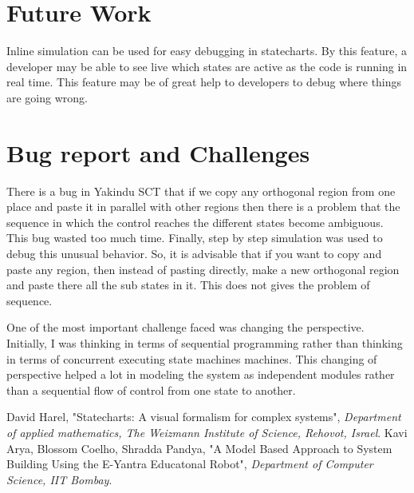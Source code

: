 \documentclass[a4paper,12pt,oneside]{book}
\begin{document}
\section{Future Work}
Inline simulation can be used for easy debugging in statecharts. By this feature, a developer may be able to see live which states are active as the code is running in real time. This feature may be of great help to developers to debug where things are going wrong.
\pagebreak
\section{Bug report and Challenges}
There is a bug in Yakindu SCT that if we copy any orthogonal region from one place and paste it in parallel with other regions then there is a problem that the sequence in which the control reaches the different states become ambiguous. This bug wasted too much time. Finally, step by step simulation was used to debug this unusual behavior. So, it is advisable that if you want to copy and paste any region, then instead of pasting directly, make a new orthogonal region and paste there all the sub states in it. This does not gives the problem of sequence.

One of the most important challenge faced was changing the perspective. Initially, I was thinking in terms of sequential programming rather than thinking in terms of concurrent executing state machines machines. This changing of perspective helped a lot in modeling the system as independent modules rather than a sequential flow of control from one state to another. 
\begin{thebibliography}{li}
 David Harel, "Statecharts: A visual formalism for complex systems", \emph{Department of applied mathematics, The Weizmann Institute
	of Science, Rehovot, Israel}.
 Kavi Arya, Blossom Coelho, Shradda Pandya, "A Model Based Approach to System Building Using the E-Yantra Educatonal Robot", \emph{Department of Computer Science, IIT Bombay}.
\end{thebibliography}
\end{document}
